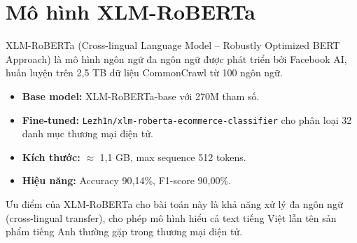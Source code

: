 \section{Mô hình XLM-RoBERTa}

XLM-RoBERTa (Cross-lingual Language Model -- Robustly Optimized BERT Approach)
là mô hình ngôn ngữ đa ngôn ngữ được phát triển bởi Facebook AI, huấn luyện
trên 2,5 TB dữ liệu CommonCrawl từ 100 ngôn ngữ.

\begin{itemize}
\item \textbf{Base model:} XLM-RoBERTa-base với 270M tham số.
\item \textbf{Fine-tuned:} \texttt{Lezh1n/xlm-roberta-ecommerce-classifier}
  cho phân loại 32 danh mục thương mại điện tử.
\item \textbf{Kích thước:} $\approx$ 1,1 GB, max sequence 512 tokens.
\item \textbf{Hiệu năng:} Accuracy 90,14\%, F1-score 90,00\%.
\end{itemize}

Ưu điểm của XLM-RoBERTa cho bài toán này là khả năng xử lý đa ngôn ngữ
(cross-lingual transfer), cho phép mô hình hiểu cả text tiếng Việt lẫn
tên sản phẩm tiếng Anh thường gặp trong thương mại điện tử.
